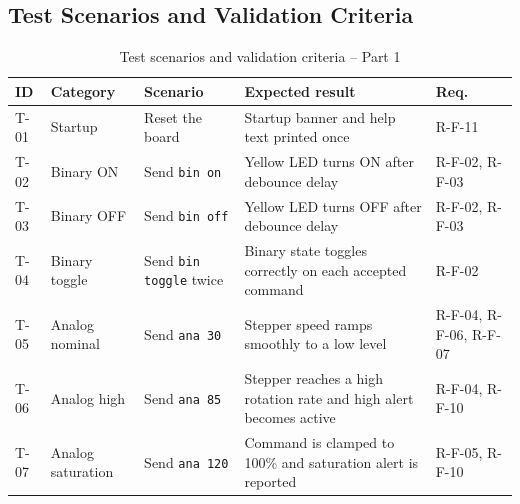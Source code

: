 \documentclass[12pt]{article}
\begin{document}
\subsection{Test Scenarios and Validation Criteria}

{\scriptsize
\renewcommand{\arraystretch}{0.96}
\begin{table}[H]
\centering
\begin{tabular}{p{0.8cm} p{2.0cm} p{3.8cm} p{3.8cm} p{0.9cm}}
\toprule
\textbf{ID} & \textbf{Category} & \textbf{Scenario} & \textbf{Expected result} & \textbf{Req.} \\
\midrule
T-01 & Startup & Reset the board & Startup banner and help text printed once & R-F-11 \\
T-02 & Binary ON & Send \texttt{bin on} & Yellow LED turns ON after debounce delay & R-F-02, R-F-03 \\
T-03 & Binary OFF & Send \texttt{bin off} & Yellow LED turns OFF after debounce delay & R-F-02, R-F-03 \\
T-04 & Binary toggle & Send \texttt{bin toggle} twice & Binary state toggles correctly on each accepted command & R-F-02 \\
T-05 & Analog nominal & Send \texttt{ana 30} & Stepper speed ramps smoothly to a low level & R-F-04, R-F-06, R-F-07 \\
T-06 & Analog high & Send \texttt{ana 85} & Stepper reaches a high rotation rate and high alert becomes active & R-F-04, R-F-10 \\
T-07 & Analog saturation & Send \texttt{ana 120} & Command is clamped to 100\% and saturation alert is reported & R-F-05, R-F-10 \\
\bottomrule
\end{tabular}
\caption{Test scenarios and validation criteria -- Part 1}
\label{tab:tests1}
\end{table}

}
\end{document}
